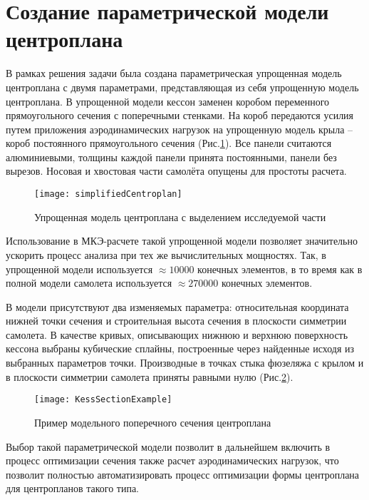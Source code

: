 \section{Создание параметрической модели центроплана}
\label{sec:creationOfModel}

В рамках решения задачи была создана параметрическая упрощенная модель центроплана с двумя параметрами, представляющая из себя упрощенную модель центроплана. В упрощенной модели кессон заменен коробом переменного прямоугольного сечения с поперечными стенками. На короб передаются усилия путем приложения аэродинамических нагрузок на упрощенную модель крыла -- короб постоянного прямоугольного сечения (Рис.\ref{fig:CurvedKessonPatran}). Все панели считаются алюминиевыми, толщины каждой панели принята постоянными, панели без вырезов. Носовая и хвостовая части самолёта опущены для простоты расчета.  



\begin{figure}[ht]
\centering
\texttt{[image: simplifiedCentroplan]}
\caption{Упрощенная модель центроплана с выделением исследуемой части}
\label{fig:CurvedKessonPatran}
\end{figure}

Использование в МКЭ-расчете такой упрощенной модели позволяет значительно ускорить процесс анализа при тех же вычислительных мощностях. Так, в упрощенной модели используется $\approx10000$ конечных элементов, в то время как в полной модели самолета используется $\approx270000$ конечных элементов.

В модели присутствуют два изменяемых параметра: относительная координата нижней точки сечения и строительная высота сечения в плоскости симметрии самолета. В качестве кривых, описывающих нижнюю и верхнюю поверхность кессона выбраны кубические сплайны, построенные через найденные исходя из выбранных параметров точки. Производные в точках стыка фюзеляжа с крылом и в плоскости симметрии самолета приняты равными нулю (Рис.\ref{fig:KessSectionExample}).

\begin{figure}[ht]
\centering
\texttt{[image: KessSectionExample]}
%
\caption{Пример модельного поперечного сечения центроплана}
\label{fig:KessSectionExample}
\end{figure}


Выбор такой параметрической модели позволит в дальнейшем включить в процесс оптимизации сечения также расчет аэродинамических нагрузок, что позволит полностью автоматизировать процесс оптимизации формы центроплана для центропланов такого типа. 

